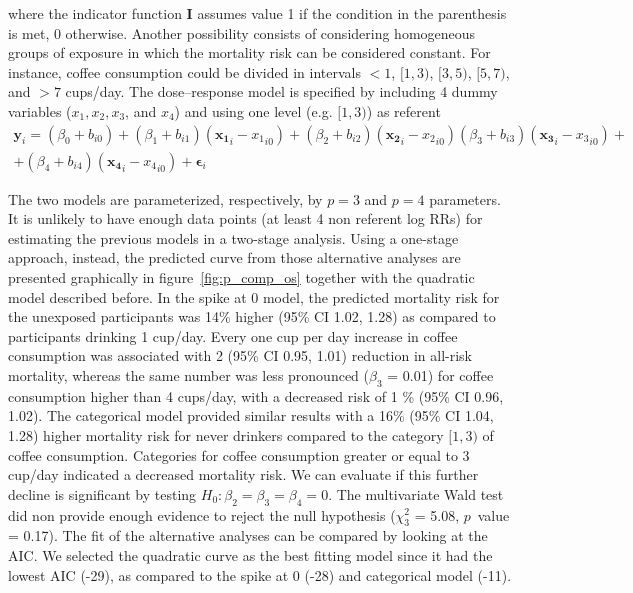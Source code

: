 \documentclass[11pt,a4paper,twoside,openany]{book}\usepackage{knitr}
\begin{document}
{\noindent where the indicator function $\mathbf{I}$ assumes value 1 if the condition in the parenthesis  is met, 0 otherwise.
\noindent Another possibility consists of considering homogeneous groups of exposure in which the mortality risk can be considered constant. For instance, coffee consumption could be divided in intervals $< 1$, $[1, 3)$, $[3, 5)$, $[5, 7)$, and $> 7$ cups/day. The dose--response model is specified by including 4 dummy variables ($x_1, x_2, x_3$, and $x_4$) and using one level (e.g. $[1, 3)$) as referent
\begin{multline*}
\mathbf{y}_i =  (\beta_0 + b_{i0}) + (\beta_1 + b_{i1}) (\mathbf{x_1}_{i} - {x_1}_{i0}) + (\beta_2  + b_{i2}) (\mathbf{x_2}_{i} - {x_2}_{i0})
(\beta_3 + b_{i3}) (\mathbf{x_3}_{i} - {x_3}_{i0}) + \\  + (\beta_4 + b_{i4}) (\mathbf{x_4}_{i} - {x_4}_{i0}) + \boldsymbol{\epsilon}_{i}
\end{multline*}

\noindent The two models are parameterized, respectively, by $p = 3$ and $p = 4$ parameters. It is unlikely to have enough data points (at least 4 non referent log RRs) for estimating the previous models in a two-stage analysis. Using a one-stage approach, instead, the predicted curve from those alternative analyses are presented graphically in figure~\ref{fig:p_comp_os} together with the quadratic model described before. 
In the spike at 0 model, the predicted mortality risk for the unexposed participants was 14\% higher (95\% CI 1.02, 1.28) as compared to participants drinking 1 cup/day. Every one cup per day increase in coffee consumption was associated with 2 (95\% CI 0.95, 1.01) reduction in all-risk mortality, whereas the same number was less pronounced ($\beta_3$ = 0.01) for coffee consumption higher than 4 cups/day, with a decreased risk of 1 \% (95\% CI 0.96, 1.02). 
The categorical model provided similar results with a 16\% (95\% CI 1.04, 1.28) higher mortality risk for never drinkers compared to the category $[1, 3)$ of coffee consumption. Categories for coffee consumption greater or equal to 3 cup/day indicated a decreased mortality risk. We can evaluate if this further decline is significant by testing $H_0: \beta_2 = \beta_3 = \beta_4 = 0$. The multivariate Wald test did non provide enough evidence to reject the null hypothesis ($\chi_3^2$ = 5.08, $p$~value = 0.17).
The fit of the alternative analyses can be compared by looking at the AIC. We selected the quadratic curve as the best fitting model since it had the lowest AIC (-29), as compared to the spike at 0 (-28) and categorical model (-11).



}
\end{document}
